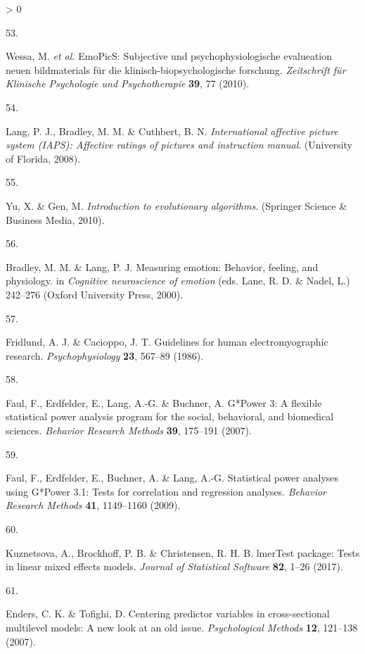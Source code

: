 \documentclass[
  english,
  man,floatsintext]{apa6}
\newlength{\cslhangindent}
\newlength{\csllabelwidth}
\newenvironment{CSLReferences}[2] %
 {%
  \setlength{\parindent}{0pt}
  \ifodd #1 \everypar{\setlength{\hangindent}{\cslhangindent}}\ignorespaces\fi
  \ifnum #2 > 0
  \setlength{\parskip}{#2\baselineskip}
  \fi
 }%
 {}
\newcommand{\CSLLeftMargin}[1]{\parbox[t]{\csllabelwidth}{#1}}
\newcommand{\CSLRightInline}[1]{\parbox[t]{\linewidth - \csllabelwidth}{#1}\break}
\begin{document}
\begin{CSLReferences}{0}{0}
\leavevmode\hypertarget{ref-Wessa2010}{}%
\CSLLeftMargin{53. }
\CSLRightInline{Wessa, M. \emph{et al.} EmoPicS: Subjective und psychophysiologische evalueation neuen bildmaterials für die klinisch-biopsychologische forschung. \emph{Zeitschrift für Klinische Psychologie und Psychotherapie} \textbf{39}, 77 (2010).}

\leavevmode\hypertarget{ref-Lang2008}{}%
\CSLLeftMargin{54. }
\CSLRightInline{Lang, P. J., Bradley, M. M. \& Cuthbert, B. N. \emph{International affective picture system (IAPS): Affective ratings of pictures and instruction manual}. (University of Florida, 2008).}

\leavevmode\hypertarget{ref-Yu2010}{}%
\CSLLeftMargin{55. }
\CSLRightInline{Yu, X. \& Gen, M. \emph{Introduction to evolutionary algorithms}. (Springer Science \& Business Media, 2010).}

\leavevmode\hypertarget{ref-Bradley2000}{}%
\CSLLeftMargin{56. }
\CSLRightInline{Bradley, M. M. \& Lang, P. J. Measuring emotion: Behavior, feeling, and physiology. in \emph{Cognitive neuroscience of emotion} (eds. Lane, R. D. \& Nadel, L.) 242--276 (Oxford University Press, 2000).}

\leavevmode\hypertarget{ref-Fridlund1986}{}%
\CSLLeftMargin{57. }
\CSLRightInline{Fridlund, A. J. \& Cacioppo, J. T. Guidelines for human electromyographic research. \emph{Psychophysiology} \textbf{23}, 567--89 (1986).}

\leavevmode\hypertarget{ref-Faul2007}{}%
\CSLLeftMargin{58. }
\CSLRightInline{Faul, F., Erdfelder, E., Lang, A.-G. \& Buchner, A. G*{Power} 3: {A} flexible statistical power analysis program for the social, behavioral, and biomedical sciences. \emph{Behavior Research Methods} \textbf{39}, 175--191 (2007).}

\leavevmode\hypertarget{ref-Faul2009}{}%
\CSLLeftMargin{59. }
\CSLRightInline{Faul, F., Erdfelder, E., Buchner, A. \& Lang, A.-G. Statistical power analyses using {G}*{Power} 3.1: {Tests} for correlation and regression analyses. \emph{Behavior Research Methods} \textbf{41}, 1149--1160 (2009).}

\leavevmode\hypertarget{ref-Kuznetsova2017}{}%
\CSLLeftMargin{60. }
\CSLRightInline{Kuznetsova, A., Brockhoff, P. B. \& Christensen, R. H. B. {lmerTest} package: Tests in linear mixed effects models. \emph{Journal of Statistical Software} \textbf{82}, 1--26 (2017).}

\leavevmode\hypertarget{ref-Enders2007}{}%
\CSLLeftMargin{61. }
\CSLRightInline{Enders, C. K. \& Tofighi, D. Centering predictor variables in cross-sectional multilevel models: {A} new look at an old issue. \emph{Psychological Methods} \textbf{12}, 121--138 (2007).}


\end{CSLReferences}
\end{document}
